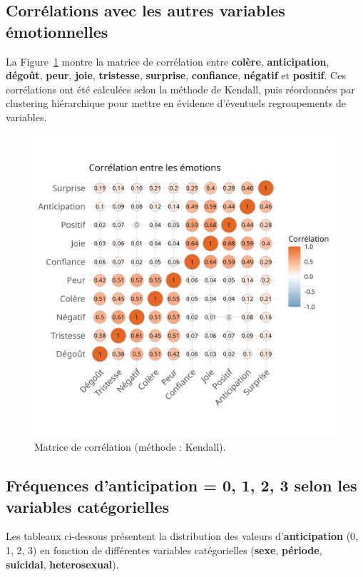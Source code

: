 \documentclass[12pt,a4paper]{article}
\begin{document}
\subsection{Corrélations avec les autres variables émotionnelles}
La Figure~\ref{fig:cor_ggcorrplot} montre la matrice de corrélation entre \textbf{colère}, 
\textbf{anticipation}, \textbf{dégoût}, \textbf{peur}, \textbf{joie}, \textbf{tristesse}, 
\textbf{surprise}, \textbf{confiance}, \textbf{négatif} et \textbf{positif}. 
Ces corrélations ont été calculées selon la méthode de Kendall, puis réordonnées
par clustering hiérarchique pour mettre en évidence d’éventuels regroupements de variables.

\begin{figure}[H]
	\centering
	\includegraphics[width=1\textwidth]{figures/correlation_ggcorrplot.png}
	\caption{Matrice de corrélation (méthode : Kendall).}
	\label{fig:cor_ggcorrplot}
\end{figure}

\subsection{Fréquences d’anticipation = 0, 1, 2, 3 selon les variables catégorielles}
Les tableaux ci-dessous présentent la distribution des valeurs d’\textbf{anticipation}
(0, 1, 2, 3) en fonction de différentes variables catégorielles (\textbf{sexe},
\textbf{période}, \textbf{suicidal}, \textbf{heterosexual}).
\end{document}
